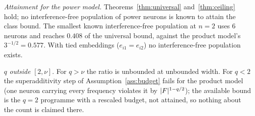 \emph{Attainment for the power model.} Theorems~\ref{thm:universal} and~\ref{thm:ceiling} hold; no
interference-free population of power neurons is known to attain the class bound. The smallest known
interference-free population at $n=2$ uses $6$ neurons and reaches $0.408$ of the universal bound, against
the product model's $3^{-1/2}=0.577$. With tied embeddings ($e_{i1}=e_{i2}$) no interference-free population
exists.

\emph{$q$ outside $[2,\nu]$.} For $q>\nu$ the ratio is unbounded at unbounded width. For $q<2$ the
superadditivity step of Assumption~\ref{ass:budget} fails for the product model (one neuron carrying every
frequency violates it by $|F|^{1-q/2}$); the available bound is the $q=2$ programme with a rescaled budget,
not attained, so nothing about the count is claimed there.
